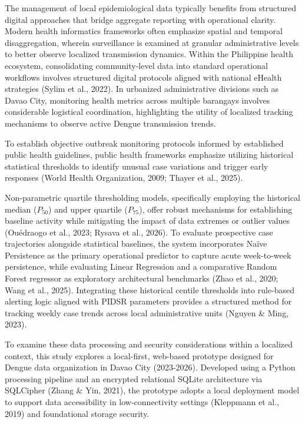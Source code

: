 \documentclass[
]{article}
\begin{document}
The management of local epidemiological data typically benefits from
structured digital approaches that bridge aggregate reporting with
operational clarity. Modern health informatics frameworks often
emphasize spatial and temporal disaggregation, wherein surveillance is
examined at granular administrative levels to better observe localized
transmission dynamics. Within the Philippine health ecosystem,
consolidating community-level data into standard operational workflows
involves structured digital protocols aligned with national eHealth
strategies (Sylim et al., 2022). In urbanized administrative divisions
such as Davao City, monitoring health metrics across multiple barangays
involves considerable logistical coordination, highlighting the utility
of localized tracking mechanisms to observe active Dengue transmission
trends.

To establish objective outbreak monitoring protocols informed by
established public health guidelines, public health frameworks emphasize
utilizing historical statistical thresholds to identify unusual case
variations and trigger early responses (World Health Organization, 2009;
Thayer et al., 2025).

Non-parametric quartile thresholding models, specifically employing the
historical median (\(P_{50}\)) and upper quartile (\(P_{75}\)), offer
robust mechanisms for establishing baseline activity while mitigating
the impact of data extremes or outlier values (Ouédraogo et al., 2023;
Rysava et al., 2026). To evaluate prospective case trajectories
alongside statistical baselines, the system incorporates Naïve
Persistence as the primary operational predictor to capture acute
week-to-week persistence, while evaluating Linear Regression and a
comparative Random Forest regressor as exploratory architectural
benchmarks (Zhao et al., 2020; Wang et al., 2025). Integrating these
historical centile thresholds into rule-based alerting logic aligned
with PIDSR parameters provides a structured method for tracking weekly
case trends across local administrative units (Nguyen \& Ming, 2023).

To examine these data processing and security considerations within a
localized context, this study explores a local-first, web-based
prototype designed for Dengue data organization in Davao City
(2023-2026). Developed using a Python processing pipeline and an
encrypted relational SQLite architecture via SQLCipher (Zhang \& Yin,
2021), the prototype adopts a local deployment model to support data
accessibility in low-connectivity settings (Kleppmann et al., 2019) and
foundational storage security.
\end{document}
